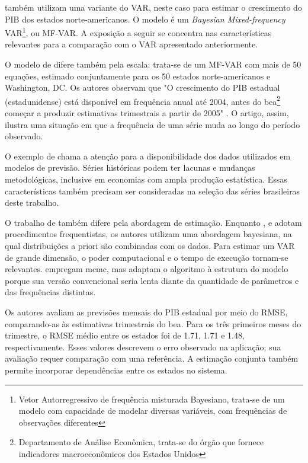  também utilizam uma variante do VAR, neste caso para estimar o crescimento do PIB dos estados norte-americanos. O modelo é um \textit{Bayesian Mixed-frequency} VAR\footnote{Vetor Autorregressivo de frequência misturada Bayesiano, trata-se de um modelo com capacidade de modelar diversas variáveis, com frequências de observações diferentes}, ou MF-VAR. A exposição a seguir se concentra nas características relevantes para a comparação com o VAR apresentado anteriormente.

O modelo de  difere também pela escala: trata-se de um MF-VAR com mais de 50 equações, estimado conjuntamente para os 50 estados norte-americanos e Washington, DC. Os autores observam que "O crescimento do PIB estadual (estadunidense) está disponível em frequência anual até 2004, antes do \ac{bea}\footnote{Departamento de Análise Econômica, trata-se do órgão que fornece indicadores macroeconômicos dos Estados Unidos} começar a produzir estimativas trimestrais a partir de 2005" . O artigo, assim, ilustra uma situação em que a frequência de uma série muda ao longo do período observado.

O exemplo de  chama a atenção para a disponibilidade dos dados utilizados em modelos de previsão. Séries históricas podem ter lacunas e mudanças metodológicas, inclusive em economias com ampla produção estatística. Essas características também precisam ser consideradas na seleção das séries brasileiras deste trabalho.

O trabalho de  também difere pela abordagem de estimação. Enquanto ,  e  adotam procedimentos frequentistas, os autores utilizam uma abordagem bayesiana, na qual distribuições a priori são combinadas com os dados. Para estimar um VAR de grande dimensão, o poder computacional e o tempo de execução tornam-se relevantes.  empregam \ac{mcmc}, mas adaptam o algoritmo à estrutura do modelo porque sua versão convencional seria lenta diante da quantidade de parâmetros e das frequências distintas.

Os autores avaliam as previsões mensais do PIB estadual por meio do RMSE, comparando-as às estimativas trimestrais do \ac{bea}. Para os três primeiros meses do trimestre, o RMSE médio entre os estados foi de 1.71, 1.71 e 1.48, respectivamente. Esses valores descrevem o erro observado na aplicação; sua avaliação requer comparação com uma referência. A estimação conjunta também permite incorporar dependências entre os estados no sistema.

